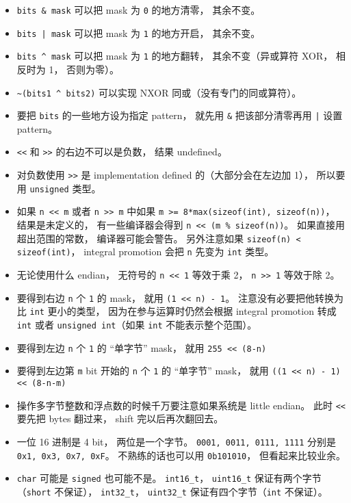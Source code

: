 
\begin{issues}
\issueDraft
\end{issues}

\begin{itemize}
\item \verb`bits & mask` 可以把 mask 为 \verb`0` 的地方清零， 其余不变。
\item \verb`bits | mask` 可以把 mask 为 \verb`1` 的地方开启， 其余不变。
\item \verb`bits ^ mask` 可以把 mask 为 \verb`1` 的地方翻转， 其余不变（异或算符 XOR， 相反时为 1， 否则为零）。
\item \verb`~(bits1 ^ bits2)` 可以实现 NXOR 同或（没有专门的同或算符）。
\item 要把 \verb`bits` 的一些地方设为指定 pattern， 就先用 \verb`&` 把该部分清零再用 \verb`|` 设置 pattern。
\item \verb`<<` 和 \verb`>>` 的右边不可以是负数， 结果 undefined。
\item 对负数使用 \verb`>>` 是 implementation defined 的（大部分会在左边加 1）， 所以要用 \verb`unsigned` 类型。
\item 如果 \verb`n << m` 或者 \verb`n >> m` 中如果 \verb`m >= 8*max(sizeof(int), sizeof(n))`， 结果是未定义的， 有一些编译器会得到 \verb`n << (m % sizeof(n))`。 如果直接用超出范围的常数， 编译器可能会警告。 另外注意如果 \verb`sizeof(n) < sizeof(int)`， integral promotion 会把 \verb`n` 先变为 \verb`int` 类型。
\item 无论使用什么 endian， 无符号的 \verb`n << 1` 等效于乘 2， \verb`n >> 1` 等效于除 2。
\item 要得到右边 \verb`n` 个 \verb`1` 的 mask， 就用 \verb`(1 << n) - 1`。 注意没有必要把他转换为比 \verb`int` 更小的类型， 因为在参与运算时仍然会根据 integral promotion 转成 \verb`int` 或者 \verb`unsigned int`（如果 \verb`int` 不能表示整个范围）。
\item 要得到左边 \verb`n` 个 \verb`1` 的 “单字节” mask， 就用 \verb`255 << (8-n)`
\item 要得到左边第 \verb`m` bit 开始的 \verb`n` 个 \verb`1` 的 “单字节” mask， 就用 \verb`((1 << n) - 1) << (8-n-m)`
\item 操作多字节整数和浮点数的时候千万要注意如果系统是 little endian。 此时 \verb`<<` 要先把 bytes 翻过来， shift 完以后再次翻回去。
\item 一位 16 进制是 4 bit， 两位是一个字节。 \verb`0001, 0011, 0111, 1111` 分别是 \verb`0x1, 0x3, 0x7, 0xF`。 不熟练的话也可以用 \verb`0b101010`， 但看起来比较业余。
\item \verb`char` 可能是 \verb`signed` 也可能不是。 \verb`int16_t`， \verb`uint16_t` 保证有两个字节（\verb`short` 不保证）， \verb`int32_t`， \verb`uint32_t` 保证有四个字节（\verb`int` 不保证）。
\end{itemize}
